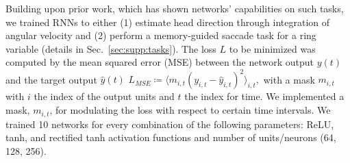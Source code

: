 \documentclass{article} %
\newcounter{ct}
\theoremstyle{definition}
\theoremstyle{remark}
\begin{document}
Building upon prior work, which has shown networks' capabilities on such tasks, we trained RNNs to either
(1) estimate head direction through integration of angular velocity \citep{cueva2019headdirection, cueva2021continuous}
and (2) perform a memory-guided saccade task for a ring variable \citep{wimmer2014} (details in Sec.~\ref{sec:supp:tasks}).
The loss \(L\) to be minimized was computed by the mean squared error (MSE) between the network output \(y(t)\) and the target output \(\hat y(t)\)
\(L_{MSE} \coloneqq \langle m_{i,t}(y_{i,t}-\hat y_{i,t})^2\rangle_{i,t}, \)
with a mask \(m_{i,t}\) with \(i\) the index of the output units and \(t\)  the index for time.
We implemented a mask, \(m_{i,t}\), for modulating the loss with respect to certain time intervals.
We trained 10 networks for every combination of the following parameters:
 ReLU, tanh, and rectified tanh activation functions and
 number of units/neurons (64, 128, 256).



\end{document}
